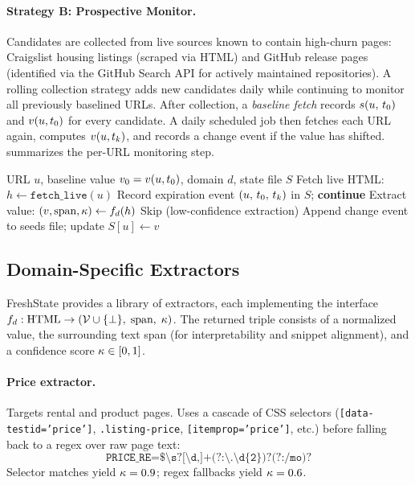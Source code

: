 \paragraph{Strategy B: Prospective Monitor.}
Candidates are collected from live sources known to contain high-churn pages:
Craigslist housing listings (scraped via HTML) and GitHub release pages (identified
via the GitHub Search API for actively maintained repositories). A rolling collection
strategy adds new candidates daily while continuing to monitor all previously
baselined URLs. After collection, a \emph{baseline fetch} records $s(u,\,t_0)$
and $v(u, t_0)$ for every candidate. A daily scheduled job then fetches each
URL again, computes $v(u, t_k)$, and records a change event if the value has
shifted.  summarizes the per-URL monitoring step.

\begin{algorithm}[t]
\caption{Per-URL monitoring step (Strategy B)}
\label{alg:monitor}
\begin{algorithmic}[1]
\REQUIRE URL $u$, baseline value $v_0 = v(u, t_0)$, domain $d$, state file $S$
\STATE Fetch live HTML: $h \leftarrow \texttt{fetch\_live}(u)$
  \STATE Record expiration event $(u,\, t_0,\, t_k)$ in $S$; \textbf{continue}
\ENDIF
\STATE Extract value: $(v, \text{span}, \kappa) \leftarrow f_d(h)$
\IF{$\conf < \conf_{\min}$}
  \STATE Skip (low-confidence extraction)
  \STATE Append change event to seeds file; update $S[u] \leftarrow v$
\ENDIF
\end{algorithmic}
\end{algorithm}

\subsection{Domain-Specific Extractors}

FreshState provides a library of extractors, each implementing the interface
$f_d : \text{HTML} \to (\mathcal{V} \cup \{\bot\},\; \text{span},\; \kappa)$.
The returned triple consists of a normalized value, the surrounding text span
(for interpretability and snippet alignment), and a confidence score $\kappa \in [0, 1]$.

\paragraph{Price extractor.}
Targets rental and product pages. Uses a cascade of CSS selectors
(\texttt{[data-testid='price']}, \texttt{.listing-price}, \texttt{[itemprop='price']},
etc.) before falling back to a regex over raw page text:
\[
  \texttt{PRICE\_RE} = \texttt{\$\textbackslash s?[\textbackslash d,]+(?:\textbackslash
  .\textbackslash d\{2\})?(?:/mo)?}
\]
Selector matches yield $\kappa = 0.9$; regex fallbacks yield $\kappa = 0.6$.

